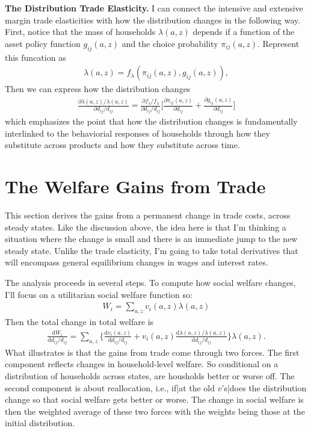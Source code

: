 \documentclass[12pt,pdftex]{article}
\begin{document}
\begin{onehalfspacing}
\textbf{The Distribution Trade Elasticity.} I can connect the intensive and extensive margin trade elasticities with how the distribution changes in the following way. First, notice that the mass of households $\lambda(a,z)$ depends if a function of the asset policy function $g_{ij}(a,z)$ and the choice probability $\pi_{ij}(a,z)$. Represent this funcation as
\begin{align}
\lambda(a,z) = f_{\lambda}(\pi_{ij}(a,z),g_{ij}(a,z)),
\end{align}
Then we can express how the distribution changes
\begin{align}
\frac{\partial \lambda(a,z)/\lambda(a,z)}{\partial d_{ij}/d_{ij}}  = \frac{\partial f_{\lambda} / f_{\lambda} }{\partial d_{ij}/d_{ij}} \bigg [ \frac{\partial \pi_{ij}(a,z)}{\partial d_{ij}} +  \frac{\partial g_{ij}(a,z)}{\partial d_{ij}} \bigg ]
\end{align}
which emphasizes the point that how the distribution changes is fundamentally interlinked to the behaviorial responses of households through how they substitute across products and how they substitute across time. 

\section{The Welfare Gains from Trade}

This section derives the gains from a permanent change in trade costs, across steady states. Like the discussion above, the idea here is that I'm thinking a situation where the change is small and there is an immediate jump to the new steady state. Unlike the trade elasticity, I'm going to take total derivatives that will encompass general equilibrium changes in wages and interest rates. 

The analysis proceeds in several steps. To compute how social welfare changes, I'll focus on a utilitarian social welfare function so:
\begin{align}
W_{i} = \sum_{a,z} v_{i}(a,z)\lambda(a,z)
\end{align}
Then the total change in total welfare is
\begin{align}
\frac{\mathrm{d} W_{i}}{\mathrm{d} d_{ij} / d_{ij}} = \sum_{a,z} \bigg \{ \frac{\mathrm{d} v_i(a, z)}{\mathrm{d} d_{ij} / d_{ij}}  + v_{i}(a,z) \frac{\mathrm{d} \lambda(a,z)/ \lambda(a,z)}{\mathrm{d} d_{ij} / d_{ij}}  \bigg \} \lambda(a,z).
\end{align}
What illustrates is that the gains from trade come through two forces. The first component reflects changes in household-level welfare. So conditional on a distribution of households across states, are housholds better or worse off. The second component is about reallocation, i.e., if|at the old $v$'s|does the distribution change so that social welfare gets better or worse. The change in social welfare is then the weighted average of these two forces with the weights being those at the initial distribution. 


\end{onehalfspacing}
\end{document}
